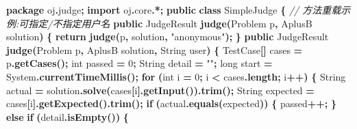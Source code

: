 \documentclass[
  11pt,
]{ctexart}
\newenvironment{Shaded}{\begin{snugshade}}{\end{snugshade}}
\newcommand{\BuiltInTok}[1]{#1}
\newcommand{\CommentTok}[1]{\textcolor[rgb]{0.56,0.35,0.01}{\textit{#1}}}
\newcommand{\ControlFlowTok}[1]{\textcolor[rgb]{0.13,0.29,0.53}{\textbf{#1}}}
\newcommand{\DataTypeTok}[1]{\textcolor[rgb]{0.13,0.29,0.53}{#1}}
\newcommand{\DecValTok}[1]{\textcolor[rgb]{0.00,0.00,0.81}{#1}}
\newcommand{\FunctionTok}[1]{\textcolor[rgb]{0.13,0.29,0.53}{\textbf{#1}}}
\newcommand{\ImportTok}[1]{#1}
\newcommand{\KeywordTok}[1]{\textcolor[rgb]{0.13,0.29,0.53}{\textbf{#1}}}
\newcommand{\NormalTok}[1]{#1}
\newcommand{\OperatorTok}[1]{\textcolor[rgb]{0.81,0.36,0.00}{\textbf{#1}}}
\newcommand{\StringTok}[1]{\textcolor[rgb]{0.31,0.60,0.02}{#1}}
\begin{document}
\begin{Shaded}
\begin{Highlighting}[]
\KeywordTok{package}\ImportTok{ oj}\OperatorTok{.}\ImportTok{judge}\OperatorTok{;}
\KeywordTok{import} \ImportTok{oj}\OperatorTok{.}\ImportTok{core}\OperatorTok{.*;}
\KeywordTok{public} \KeywordTok{class}\NormalTok{ SimpleJudge }\OperatorTok{\{}
    \CommentTok{// 方法重载示例:可指定/不指定用户名}
    \KeywordTok{public}\NormalTok{ JudgeResult }\FunctionTok{judge}\OperatorTok{(}\NormalTok{Problem p}\OperatorTok{,}\NormalTok{ AplusB solution}\OperatorTok{)} \OperatorTok{\{}
        \ControlFlowTok{return} \FunctionTok{judge}\OperatorTok{(}\NormalTok{p}\OperatorTok{,}\NormalTok{ solution}\OperatorTok{,} \StringTok{"anonymous"}\OperatorTok{);}
    \OperatorTok{\}}
    \KeywordTok{public}\NormalTok{ JudgeResult }\FunctionTok{judge}\OperatorTok{(}\NormalTok{Problem p}\OperatorTok{,}\NormalTok{ AplusB solution}\OperatorTok{,} \BuiltInTok{String}\NormalTok{ user}\OperatorTok{)} \OperatorTok{\{}
\NormalTok{        TestCase}\OperatorTok{[]}\NormalTok{ cases }\OperatorTok{=}\NormalTok{ p}\OperatorTok{.}\FunctionTok{getCases}\OperatorTok{();}
        \DataTypeTok{int}\NormalTok{ passed }\OperatorTok{=} \DecValTok{0}\OperatorTok{;}
        \BuiltInTok{String}\NormalTok{ detail }\OperatorTok{=} \StringTok{""}\OperatorTok{;}
        \DataTypeTok{long}\NormalTok{ start }\OperatorTok{=} \BuiltInTok{System}\OperatorTok{.}\FunctionTok{currentTimeMillis}\OperatorTok{();}
        \ControlFlowTok{for} \OperatorTok{(}\DataTypeTok{int}\NormalTok{ i }\OperatorTok{=} \DecValTok{0}\OperatorTok{;}\NormalTok{ i }\OperatorTok{\textless{}}\NormalTok{ cases}\OperatorTok{.}\FunctionTok{length}\OperatorTok{;}\NormalTok{ i}\OperatorTok{++)} \OperatorTok{\{}
            \BuiltInTok{String}\NormalTok{ actual   }\OperatorTok{=}\NormalTok{ solution}\OperatorTok{.}\FunctionTok{solve}\OperatorTok{(}\NormalTok{cases}\OperatorTok{[}\NormalTok{i}\OperatorTok{].}\FunctionTok{getInput}\OperatorTok{()).}\FunctionTok{trim}\OperatorTok{();}
            \BuiltInTok{String}\NormalTok{ expected }\OperatorTok{=}\NormalTok{ cases}\OperatorTok{[}\NormalTok{i}\OperatorTok{].}\FunctionTok{getExpected}\OperatorTok{().}\FunctionTok{trim}\OperatorTok{();}
            \ControlFlowTok{if} \OperatorTok{(}\NormalTok{actual}\OperatorTok{.}\FunctionTok{equals}\OperatorTok{(}\NormalTok{expected}\OperatorTok{))} \OperatorTok{\{}
\NormalTok{                passed}\OperatorTok{++;}
            \OperatorTok{\}} \ControlFlowTok{else} \ControlFlowTok{if} \OperatorTok{(}\NormalTok{detail}\OperatorTok{.}\FunctionTok{isEmpty}\OperatorTok{())} \OperatorTok{\{}

\end{Highlighting}
\end{Shaded}
\end{document}
